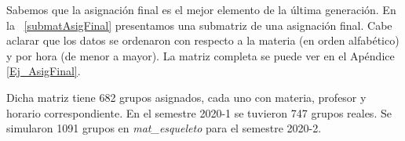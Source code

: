 %

Sabemos que la asignación final es el mejor elemento de la última generación. En la \tablename{~\ref{submatAsigFinal}} presentamos una submatriz de una asignación final. Cabe aclarar que los datos se ordenaron con respecto a la materia (en orden alfabético) y por hora (de menor a mayor). La matriz completa se puede ver en el Apéndice \ref{Ej_AsigFinal}.

Dicha matriz tiene 682 grupos asignados, cada uno con materia, profesor y horario correspondiente. En el semestre 2020-1 se tuvieron 747 grupos reales. Se simularon 1091 grupos en \textit{mat\_esqueleto} para el semestre 2020-2.

